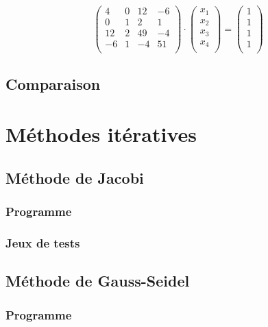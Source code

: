 \documentclass{report}
\begin{document}
        \begin{equation}
        \begin{pmatrix}
		  4 & 0 & 12 & -6 \\
		  0 & 1 & 2 & 1 \\
		  12 & 2 & 49 & -4 \\
		  -6 & 1 & -4 & 51 \\
        \end{pmatrix}
        \cdot
        \begin{pmatrix}
          x_1 \\
          x_2 \\
          x_3 \\
          x_4 \\
        \end{pmatrix}
        =
        \begin{pmatrix}
          1 \\
          1 \\
          1 \\
          1 \\
        \end{pmatrix}
        \end{equation}
    \newpage
    \section{Comparaison}
  \chapter{Méthodes itératives}
  	\section{Méthode de Jacobi}
  	  \subsection{Programme}
        
      \newpage
      \subsection{Jeux de tests}
  	\newpage
  	\section{Méthode de Gauss-Seidel}
  	  \subsection{Programme}
      \newpage
\end{document}
